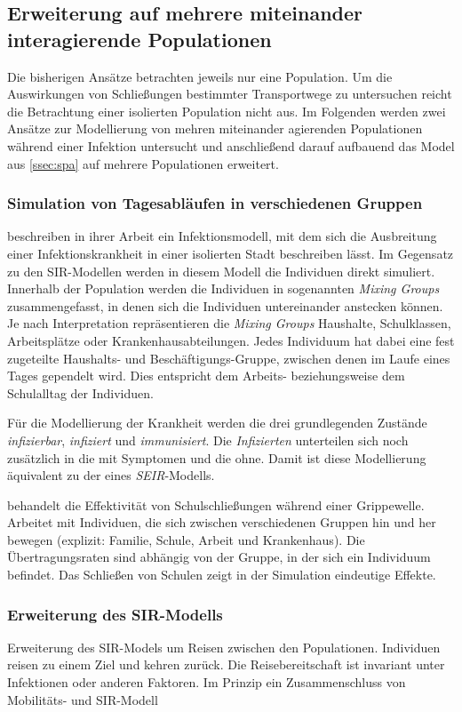 \subsection{Erweiterung auf mehrere miteinander interagierende Populationen}\label{ssec:multiPop}
\steffen
Die bisherigen Ansätze betrachten jeweils nur eine Population. Um die Auswirkungen von Schließungen bestimmter Transportwege zu untersuchen reicht die Betrachtung einer isolierten Population nicht aus. Im Folgenden werden zwei Ansätze zur Modellierung von mehren miteinander agierenden Populationen während einer Infektion untersucht und anschließend darauf aufbauend das Model aus \ref{ssec:spa} auf mehrere Populationen erweitert.
\subsubsection{Simulation von Tagesabläufen in verschiedenen Gruppen}
\cite{Capasso1978} beschreiben in ihrer Arbeit ein Infektionsmodell, mit dem sich die Ausbreitung einer Infektionskrankheit in einer isolierten Stadt beschreiben lässt. Im Gegensatz zu den SIR-Modellen werden in diesem Modell die Individuen direkt simuliert. Innerhalb der Population werden die Individuen in sogenannten \emph{Mixing Groups} zusammengefasst, in denen sich die Individuen untereinander anstecken können. Je nach Interpretation repräsentieren die \emph{Mixing Groups} Haushalte, Schulklassen, Arbeitsplätze oder Krankenhausabteilungen. Jedes Individuum hat dabei eine fest zugeteilte Haushalts- und Beschäftigungs-Gruppe, zwischen denen im Laufe eines Tages gependelt wird. Dies entspricht dem Arbeits- beziehungsweise dem Schulalltag der Individuen.

Für die Modellierung der Krankheit werden die drei grundlegenden Zustände \emph{infizierbar}, \emph{infiziert} und \emph{immunisiert}. Die \emph{Infizierten} unterteilen sich noch zusätzlich in die mit Symptomen und die ohne. Damit ist diese Modellierung äquivalent zu der eines \emph{SEIR}-Modells.


behandelt die Effektivität von Schulschließungen während einer Grippewelle. Arbeitet mit Individuen, die sich zwischen verschiedenen Gruppen hin und her bewegen (explizit: Familie, Schule, Arbeit und Krankenhaus). Die Übertragungsraten sind abhängig von der Gruppe, in der sich ein Individuum befindet. Das Schließen von Schulen zeigt in der Simulation eindeutige Effekte.
\subsubsection{Erweiterung des SIR-Modells}
\cite{Sattenspiel1995} Erweiterung des SIR-Models um Reisen zwischen den Populationen. Individuen reisen zu einem Ziel und kehren zurück. Die Reisebereitschaft ist invariant unter Infektionen oder anderen Faktoren. Im Prinzip ein Zusammenschluss von Mobilitäts- und SIR-Modell

